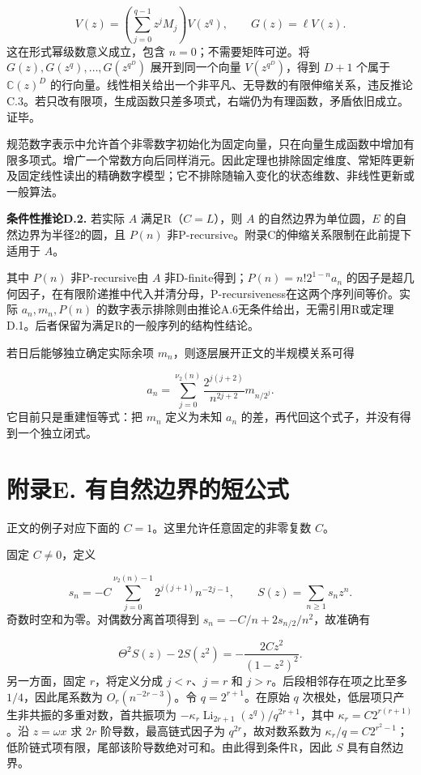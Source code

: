 \documentclass[UTF8,11pt,fontset=fandol]{ctexart}
\begin{document}
\[
V(z)=\left(\sum_{j=0}^{q-1}z^jM_j\right)V(z^q),\qquad G(z)=\ell V(z).
\]
这在形式幂级数意义成立，包含 $n=0$；不需要矩阵可逆。将 $G(z),G(z^q),\ldots,G(z^{q^D})$ 展开到同一个向量 $V(z^{q^D})$，得到 $D+1$ 个属于 $\mathbb C(z)^D$ 的行向量。线性相关给出一个非平凡、无导数的有限伸缩关系，违反推论C.3。若只改有限项，生成函数只差多项式，右端仍为有理函数，矛盾依旧成立。证毕。

规范数字表示中允许首个非零数字初始化为固定向量，只在向量生成函数中增加有限多项式。增广一个常数方向后同样消元。因此定理也排除固定维度、常矩阵更新及固定线性读出的精确数字模型；它不排除随输入变化的状态维数、非线性更新或一般算法。

\textbf{条件性推论D.2.} 若实际 $A$ 满足R（$C=L$），则 $A$ 的自然边界为单位圆，$E$ 的自然边界为半径2的圆，且 $P(n)$ 非P-recursive。附录C的伸缩关系限制在此前提下适用于 $A$。

其中 $P(n)$ 非P-recursive由 $A$ 非D-finite得到；$P(n)=n!2^{1-n}a_n$ 的因子是超几何因子，在有限阶递推中代入并清分母，P-recursiveness在这两个序列间等价。实际 $a_n,m_n,P(n)$ 的数字表示排除则由推论A.6无条件给出，无需引用R或定理D.1。后者保留为满足R的一般序列的结构性结论。

若日后能够独立确定实际余项 $m_n$，则逐层展开正文的半规模关系可得

\[
a_n=\sum_{j=0}^{\nu_2(n)}\frac{2^{j(j+2)}}{n^{2j+2}}m_{n/2^j}.
\]
它目前只是重建恒等式：把 $m_n$ 定义为未知 $a_n$ 的差，再代回这个式子，并没有得到一个独立闭式。

\section*{附录E. 有自然边界的短公式}
正文的例子对应下面的 $C=1$。这里允许任意固定的非零复数 $C$。

固定 $C\ne0$，定义

\[
s_n=-C\sum_{j=0}^{\nu_2(n)-1}2^{j(j+1)}n^{-2j-1},\qquad S(z)=\sum_{n\ge1}s_nz^n.
\]
奇数时空和为零。对偶数分离首项得到 $s_n=-C/n+2s_{n/2}/n^2$，故准确有

\[
\Theta^2S(z)-2S(z^2)=-\frac{2Cz^2}{(1-z^2)^2}.
\]
另一方面，固定 $r$，将定义分成 $j<r$、$j=r$ 和 $j>r$。后段相邻存在项之比至多 $1/4$，因此尾系数为 $O_r(n^{-2r-3})$。令 $q=2^{r+1}$。在原始 $q$ 次根处，低层项只产生非共振的多重对数，首共振项为 $-\kappa_r\operatorname{Li}_{2r+1}(z^q)/q^{2r+1}$，其中 $\kappa_r=C2^{r(r+1)}$。沿 $z=\omega x$ 求 $2r$ 阶导数，最高链式因子为 $q^{2r}$，故对数系数为 $\kappa_r/q=C2^{r^2-1}$；低阶链式项有限，尾部该阶导数绝对可和。由此得到条件R，因此 $S$ 具有自然边界。
\end{document}
